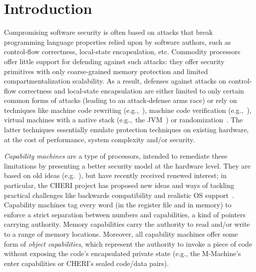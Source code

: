 \documentclass[compsoc,conference,letterpaper,fleqn]{IEEEtran}
\begin{document}
\section{Introduction}
\label{sec:introduction}

Compromising software security is often based on attacks that break programming
language properties relied upon by software authors, such as control-flow
correctness, local-state encapsulation, etc. Commodity processors offer little
support for defending against such attacks: they offer security primitives with
only coarse-grained memory protection and limited compartmentalization
scalability. As a result, defenses against attacks on control-flow correctness
and local-state encapsulation are either limited to only certain common forms of
attacks (leading to an attack-defense arms race) or rely on techniques like
machine code rewriting
(e.g.,~\cite{wahbe_efficient_1993,abadi_control-flow_2005}), machine code
verification (e.g.,~\cite{morrisett_system_1999}), virtual machines with a
native stack (e.g.,~the JVM~\citep{lindholm_java_2014}) or
randomization~\citep{forrest_building_1997}. The latter techniques essentially
emulate protection techniques on existing hardware, at the cost of performance,
system complexity and/or security.

\emph{Capability machines} are a type of processors, intended to
remediate these limitations by presenting a better security model at
the hardware level. They are based on old ideas
(e.g.~\cite{Carter:1994:HSF:195473.195579,Dennis:1966:PSM:365230.365252,shapiro_eros:_1999}),
but have recently received renewed interest; in particular, the CHERI
project has proposed new ideas and ways of tackling practical
challenges like backwards compatibility and realistic OS
support~\citep{Watson2015Cheri,Woodruff:2014:CCM:2665671.2665740}. Capability
machines tag every word (in the register file and in memory) to
enforce a strict separation between numbers and capabilities, a kind
of pointers carrying authority. Memory capabilities carry
the authority to read and/or write to a range of memory
locations. Moreover, all capability machines
offer some form of \emph{object capabilities}, which represent the
authority to invoke a piece of code without exposing the code's
encapsulated private state (e.g., the M-Machine's enter capabilities or
CHERI's sealed code/data pairs).
\end{document}
